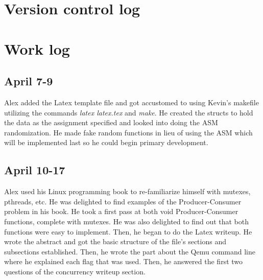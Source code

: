 \documentclass[letterpaper,10pt,titlepage]{article}
\begin{document}
\section{Version control log}
\begin{versionhistory}
\end{versionhistory}

\section{Work log}
\subsection{April 7-9}
Alex added the Latex template file and got accustomed to using Kevin's makefile utilizing the commands \emph{latex latex.tex} and \emph{make}. He created the structs to hold the data as the assignment specified and looked into doing the ASM randomization. He made fake random functions in lieu of using the ASM which will be implemented last so he could begin primary development.
\subsection{April 10-17}
Alex used his Linux programming book to re-familiarize himself with mutexes, pthreads, etc. He was delighted to find examples of the Producer-Consumer problem in his book. He took a first pass at both void Producer-Consumer functions, complete with mutexes. He was also delighted to find out that both functions were easy to implement. Then, he began to do the Latex writeup. He wrote the abstract and got the basic structure of the file's sections and subsections established. Then, he wrote the part about the Qemu command line where he explained each flag that was used. Then, he answered the first two questions of the concurrency writeup section.  
\end{document}
